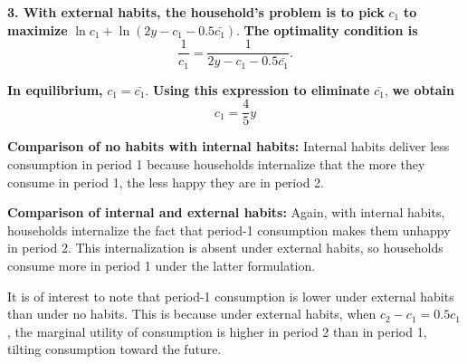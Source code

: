 \documentclass{article}
\begin{document}
\textbf{3. With external habits, the household’s problem is to pick} $c_1$ \textbf{to maximize} $\ln c_1 + \ln (2y - c_1 - 0.5 \bar{c_1})$. \textbf{The optimality condition is}
\begin{equation}
    \frac{1}{c_1} = \frac{1}{2y - c_1 - 0.5\bar{c_1}}.
\end{equation}

\textbf{In equilibrium,} $c_1 = \bar{c_1}$. \textbf{Using this expression to eliminate} $\bar{c_1}$, \textbf{we obtain}
\begin{equation}
    \boxed{c_1 = \frac{4}{5} y}
\end{equation}

\textbf{Comparison of no habits with internal habits:} Internal habits deliver less consumption in period 1 because households internalize that the more they consume in period 1, the less happy they are in period 2. 

\textbf{Comparison of internal and external habits:} Again, with internal habits, households internalize the fact that period-1 consumption makes them unhappy in period 2. This internalization is absent under external habits, so households consume more in period 1 under the latter formulation. 

It is of interest to note that period-1 consumption is lower under external habits than under no habits. This is because under external habits, when $c_2 - c_1 = 0.5 c_1$, the marginal utility of consumption is higher in period 2 than in period 1, tilting consumption toward the future.
\end{document}
